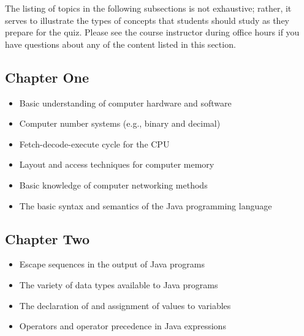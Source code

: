 The listing of topics in the following subsections is not exhaustive; rather, it serves to illustrate the types of
concepts that students should study as they prepare for the quiz. Please see the course instructor during office hours
if you have questions about any of the content listed in this section.

\vspace*{-.1in}
\subsection*{Chapter One}

\begin{itemize}

  \itemsep 0in
  \item Basic understanding of computer hardware and software
  \item Computer number systems (e.g., binary and decimal)
  \item Fetch-decode-execute cycle for the CPU
  \item Layout and access techniques for computer memory
  \item Basic knowledge of computer networking methods
  \item The basic syntax and semantics of the Java programming language

  \end{itemize}

\vspace*{-.3in}
\subsection*{Chapter Two}

\begin{itemize}

  \itemsep 0in
  \item Escape sequences in the output of Java programs
  \item The variety of data types available to Java programs
  \item The declaration of and assignment of values to variables
  \item Operators and operator precedence in Java expressions

  \end{itemize}



